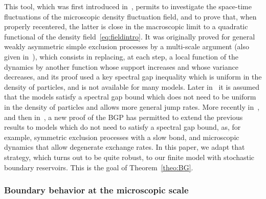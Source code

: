 \documentclass[AHL,Unicode,longabstracts]{cedram}
\begin{document}
This tool, which was first introduced in~\cite{gj2014}, permits to investigate the space-time fluctuations of the microscopic density fluctuation field, and to prove that, when properly recentered, the latter is close in the macroscopic limit to a quadratic functional of the density field~\eqref{eq:fieldintro}. It was originally proved for general weakly asymmetric simple exclusion processes by a multi-scale argument (also given in~\cite{G}), which consists in replacing, at each step, a local function of the dynamics by another function whose support increases and whose variance decreases, and its proof used a key spectral gap inequality which is uniform in the density of particles, and is not available for many models. Later in~\cite{GJS} it is assumed that the models satisfy a spectral gap bound which does not need to be uniform in the density of particles and allows more general jump rates. More recently in~\cite{fgsimon2015,GJSi}, and then in~\cite{blondel2016}, a new proof of the BGP has permitted to extend the previous results to models which do not need to satisfy a spectral gap bound, as, for example, symmetric exclusion processes with a slow bond, and microscopic dynamics that allow degenerate exchange rates. In this paper, we adapt that strategy, which turns out to be quite robust, to our finite model with stochastic boundary reservoirs. This is the goal of Theorem~\ref{theo:BG}.


\subsubsection{Boundary behavior at the microscopic scale}
\end{document}
